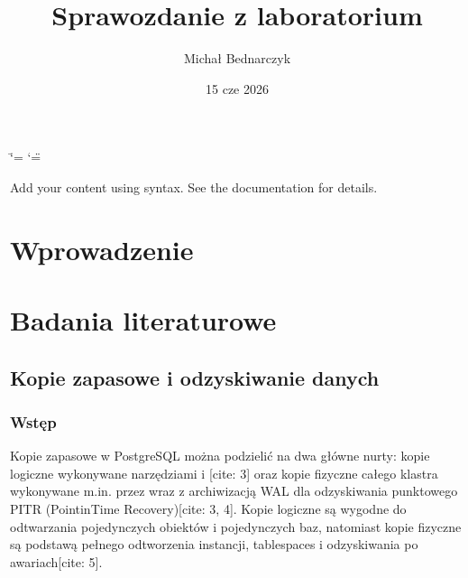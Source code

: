 \documentclass[letterpaper,10pt,polish]{sphinxmanual}
\title{Sprawozdanie z laboratorium}
\date{15 cze 2026}
\author{Michał Bednarczyk}
\begin{document}
\ifdefined\shorthandoff
  \ifnum\catcode`\=\string=\active\shorthandoff{=}\fi
  \ifnum\catcode`\"=\active{}\fi
\fi

\pagestyle{empty}
\sphinxmaketitle
\pagestyle{plain}
\sphinxtableofcontents
\pagestyle{normal}
\label{\detokenize{index::doc}}


\sphinxAtStartPar
Add your content using  syntax. See the
documentation for details.

\sphinxstepscope


\chapter{Wprowadzenie}
\label{\detokenize{rozdzial_1/index:wprowadzenie}}\label{\detokenize{rozdzial_1/index::doc}}
\sphinxstepscope


\chapter{Badania literaturowe}
\label{\detokenize{rozdzial_2/index:badania-literaturowe}}\label{\detokenize{rozdzial_2/index::doc}}
\sphinxstepscope


\section{Kopie zapasowe i odzyskiwanie danych}
\label{\detokenize{rozdzial_2/rozdzial_28/index:kopie-zapasowe-i-odzyskiwanie-danych}}\label{\detokenize{rozdzial_2/rozdzial_28/index::doc}}

\subsection{Wstęp}
\label{\detokenize{rozdzial_2/rozdzial_28/index:wstep}}
\sphinxAtStartPar
Kopie zapasowe w PostgreSQL można podzielić na dwa główne nurty: kopie logiczne wykonywane narzędziami  i  {[}cite: 3{]} oraz kopie fizyczne całego klastra wykonywane m.in. przez  wraz z archiwizacją WAL dla odzyskiwania punktowego PITR (Point\sphinxhyphen{}in\sphinxhyphen{}Time Recovery){[}cite: 3, 4{]}. Kopie logiczne są wygodne do odtwarzania pojedynczych obiektów i pojedynczych baz, natomiast kopie fizyczne są podstawą pełnego odtworzenia instancji, tablespaces i odzyskiwania po awariach{[}cite: 5{]}.
\end{document}
